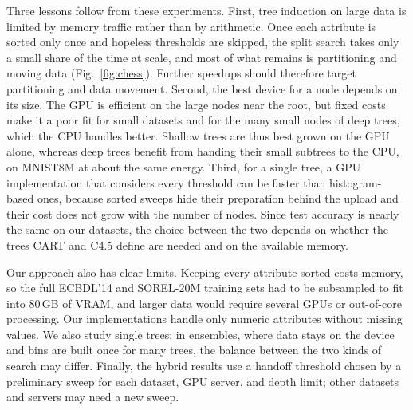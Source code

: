Three lessons follow from these experiments. First, tree induction on large data is limited by memory traffic rather than by arithmetic. Once each attribute is sorted only once and hopeless thresholds are skipped, the split search takes only a small share of the time at scale, and most of what remains is partitioning and moving data (Fig.~\ref{fig:chess}). Further speedups should therefore target partitioning and data movement. Second, the best device for a node depends on its size. The GPU is efficient on the large nodes near the root, but fixed costs make it a poor fit for small datasets and for the many small nodes of deep trees, which the CPU handles better. Shallow trees are thus best grown on the GPU alone, whereas deep trees benefit from handing their small subtrees to the CPU, on MNIST8M at about the same energy. Third, for a single tree, a GPU implementation that considers every threshold can be faster than histogram-based ones, because sorted sweeps hide their preparation behind the upload and their cost does not grow with the number of nodes. Since test accuracy is nearly the same on our datasets, the choice between the two depends on whether the trees CART and C4.5 define are needed and on the available memory.

Our approach also has clear limits. Keeping every attribute sorted costs memory, so the full ECBDL'14 and SOREL-20M training sets had to be subsampled to fit into 80\,GB of VRAM, and larger data would require several GPUs or out-of-core processing. Our implementations handle only numeric attributes without missing values. We also study single trees; in ensembles, where data stays on the device and bins are built once for many trees, the balance between the two kinds of search may differ. Finally, the hybrid results use a handoff threshold chosen by a preliminary sweep for each dataset, GPU server, and depth limit; other datasets and servers may need a new sweep.
